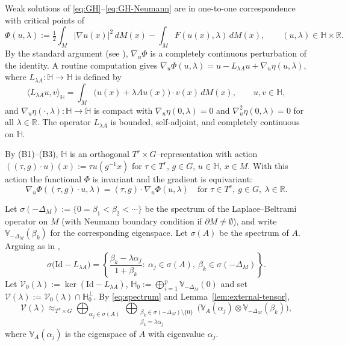\documentclass[reqno,twoside,12pt]{amsart}
\newcommand{\bH}{\mathbb{H}}
\newcommand{\bR}{\mathbb{R}}
\newcommand{\bV}{\mathbb{V}}
\newcommand{\cV}{\mathcal{V}}
\numberwithin{equation}{section} \errorcontextlines=0
\begin{document}
Weak solutions of \eqref{eq:GH}--\eqref{eq:GH-Neumann} are in one-to-one correspondence with critical points of
\[
\Phi(u,\lambda):=\tfrac12\int_{M}|\nabla u(x)|^{2}\,dM(x)-\int_{M}F(u(x),\lambda)\,dM(x),
\qquad (u,\lambda)\in\bH\times\bR.
\]
By the standard argument (see \cite{Rabinowitz1986}), $\nabla_u\Phi$ is a completely continuous perturbation of the identity. A routine computation gives
$\nabla_u\Phi(u,\lambda)=u-L_{\lambda A}u+\nabla_u\eta(u,\lambda),$
where $L_{\lambda A}\colon\bH\to\bH$ is defined by
\[
\langle L_{\lambda A}u,v\rangle_{\bH}=\int_{M}\bigl(u(x)+\lambda A u(x)\bigr)\cdot v(x)\,dM(x),\qquad u,v\in\bH,
\]
and $\nabla_u\eta(\cdot,\lambda)\colon\bH\to\bH$ is compact with $\nabla_u\eta(0,\lambda)=0$ and $\nabla_u^2\eta(0,\lambda)=0$ for all $\lambda\in\bR$. The operator $L_{\lambda A}$ is bounded, self-adjoint, and completely continuous on $\bH$.

By (B1)--(B3), $\bH$ is an orthogonal $T^{r}\times G$–representation with action $((\tau,g)\cdot u)(x):=\tau u(g^{-1}x)$ for $\tau\in T^{r}$, $g\in G$, $u\in\bH$, $x\in M$. With this action the functional $\Phi$ is invariant and the gradient is equivariant:
\[
\nabla_{u}\Phi((\tau,g)\cdot u,\lambda)=(\tau,g)\cdot\nabla_{u}\Phi(u,\lambda)\quad\text{for }\tau\in T^{r},\ g\in G,\ \lambda\in\bR.
\]

Let $\sigma(-\Delta_{M}):=\{0=\beta_{1}<\beta_{2}<\cdots\}$ be the spectrum of the Laplace--Beltrami operator on $M$ (with Neumann boundary condition if $\partial M\ne\emptyset$), and write $\bV_{-\Delta_M}(\beta_k)$ for the corresponding eigenspace. Let $\sigma(A)$ be the spectrum of $A$. Arguing as in \cite[Lemma~3.2]{GolKlu},
\begin{equation}\label{eq:spectrum}
\sigma\bigl(\mathrm{Id}-L_{\lambda A}\bigr)
=\left\{\frac{\beta_{k}-\lambda\alpha_{j}}{1+\beta_{k}}:\ \alpha_{j}\in\sigma(A),\ \beta_{k}\in\sigma(-\Delta_{M})\right\}.
\end{equation}
Let $\cV_0(\lambda) := \ker(\mathrm{Id}-L_{\lambda A})$,
$\bH_{0}:=\bigoplus_{i=1}^{p}\bV_{-\Delta_{M}}(0)$ and set $\cV(\lambda):=\cV_{0}(\lambda)\cap\bH_0^{\perp}$. By \eqref{eq:spectrum} and Lemma~\ref{lem:external-tensor},
\begin{equation}\label{eq:cvlambda}
\cV(\lambda)\approx_{T^r\times G}
\bigoplus_{\alpha_{j}\in\sigma(A)}\ \bigoplus_{\substack{\beta_{k}\in\sigma(-\Delta_{M})\setminus\{0\}\\ \beta_{k}=\lambda \alpha_{j}}}
\bigl(\bV_{A}(\alpha_{j})\otimes \bV_{-\Delta_{M}}(\beta_{k})\bigr),
\end{equation}
where $\bV_{A}(\alpha_{j})$ is the eigenspace of $A$ with eigenvalue $\alpha_{j}$.
\end{document}
